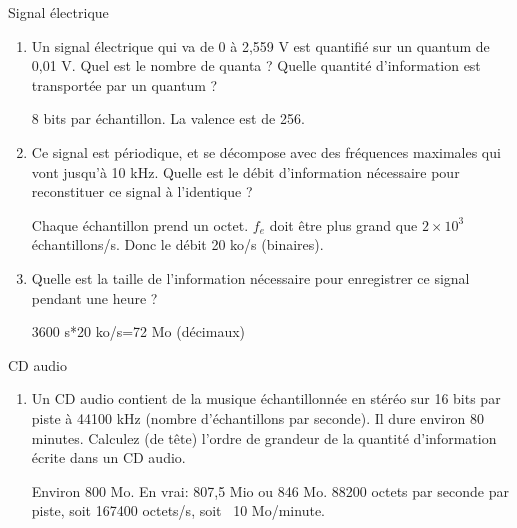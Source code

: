 \begin{exercice}
  \begin{exercicelet}{Signal électrique}
    \begin{enumerate}
    \item Un signal électrique qui va de 0 à 2,559 V est quantifié sur un quantum
      de 0,01 V. Quel est le nombre de quanta ? Quelle quantité d'information
      est transportée par un quantum ?
      \begin{xcorrection}
        8 bits par échantillon. La valence est de 256.
      \end{xcorrection}
    \item Ce signal est périodique, et se décompose avec des fréquences
      maximales qui vont jusqu'à 10 kHz. Quelle est le débit d'information
      nécessaire pour reconstituer ce signal à l'identique ?
      \begin{xcorrection}
        Chaque échantillon prend un octet. $f_e$ doit être plus grand que
        $2\times 10^3$ échantillons/s. Donc le débit 20 ko/s (binaires).
      \end{xcorrection}
    \item Quelle est la taille de l'information nécessaire pour enregistrer ce
      signal pendant une heure ?
      \begin{xcorrection}
        3600 s*20 ko/s=72 Mo (décimaux)
      \end{xcorrection}
    \end{enumerate}
  \end{exercicelet}
  \begin{exercicelet}{CD audio}
    \begin{enumerate}
    \item Un CD audio contient de la musique échantillonnée en stéréo sur 16
      bits par piste à 44100 kHz (nombre d'échantillons par seconde). Il dure
      environ 80 minutes. Calculez (de tête) l'ordre de grandeur de la
      quantité d'information écrite dans un CD audio.
      \begin{xcorrection}
        Environ 800 Mo. En vrai: 807,5 Mio ou 846 Mo.  88200 octets par
        seconde par piste, soit 167400 octets/s, soit ~10 Mo/minute.
      \end{xcorrection}
    \end{enumerate}
  \end{exercicelet}
\end{exercice}


